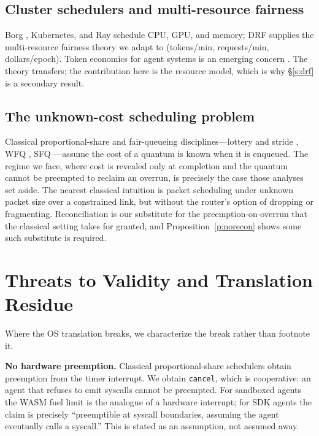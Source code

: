 \documentclass[letterpaper,11pt,leqno]{article}
\begin{document}
\subsection{Cluster schedulers and multi-resource fairness}\label{s:rel-cluster}

Borg \citep{Verma15}, Kubernetes, and Ray \citep{Moritz18} schedule CPU, GPU, and memory; DRF \citep{Ghodsi11} supplies the multi-resource fairness theory we adapt to (tokens/min, requests/min, dollars/epoch). Token economics for agent systems is an emerging concern \citep{TokenEcon26}. The theory transfers; the contribution here is the resource model, which is why \S\ref{s:drf} is a secondary result.

\subsection{The unknown-cost scheduling problem}\label{s:rel-unknown}

Classical proportional-share and fair-queueing disciplines---lottery and stride \citep{Waldspurger94, Waldspurger95}, WFQ \citep{Demers89}, SFQ \citep{Goyal96}---assume the cost of a quantum is known when it is enqueued. The regime we face, where cost is revealed only at completion and the quantum cannot be preempted to reclaim an overrun, is precisely the case those analyses set aside. The nearest classical intuition is packet scheduling under unknown packet size over a constrained link, but without the router's option of dropping or fragmenting. Reconciliation is our substitute for the preemption-on-overrun that the classical setting takes for granted, and Proposition~\ref{p:norecon} shows some such substitute is required.

\section{Threats to Validity and Translation Residue}\label{s:threats}

Where the OS translation breaks, we characterize the break rather than footnote it.

\textbf{No hardware preemption.} Classical proportional-share schedulers obtain preemption from the timer interrupt. We obtain \texttt{cancel}, which is cooperative: an agent that refuses to emit syscalls cannot be preempted. For sandboxed agents the WASM fuel limit is the analogue of a hardware interrupt; for SDK agents the claim is precisely ``preemptible at syscall boundaries, assuming the agent eventually calls a syscall.'' This is stated as an assumption, not assumed away.
\end{document}
